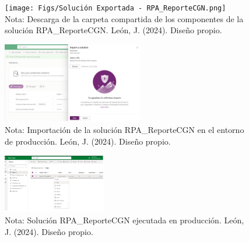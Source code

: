 \documentclass[letter,oneside,12pt,spanish]{report}
\begin{document}
\begin{figure}[ht]
    \centering
    \texttt{[image: Figs/Solución Exportada - RPA\_ReporteCGN.png]}
    \label{fig:SolutionExported}
    \\Nota: Descarga de la carpeta compartida de los componentes de la solución RPA\_ReporteCGN. León, J. (2024). Diseño propio.
\end{figure}

\begin{figure}[ht]
    \centering
    \includegraphics[width=0.55\textwidth]{Figs/Importación de la Solución - RPA_ReporteCGN.png}
    \label{fig:ImportationSolution}
    \\Nota: Importación de la solución RPA\_ReporteCGN en el entorno de producción. León, J. (2024). Diseño propio.
\end{figure}


\begin{figure}[ht]
    \centering
    \includegraphics[width=0.4\textwidth]{Figs/Solución en Producción - RPA_ReporteCGN.png}
    \label{fig:SolutionInProduction}
    \\Nota: Solución RPA\_ReporteCGN ejecutada en producción. León, J. (2024). Diseño propio.
\end{figure}
\end{document}
